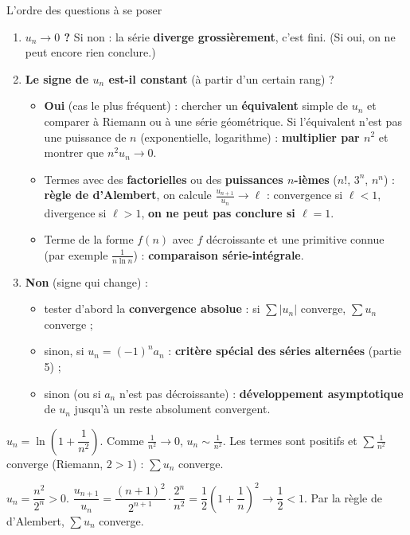 \documentclass[a4paper,10pt]{article}
\begin{document}
\begin{METH}{L'ordre des questions à se poser}
\begin{enumerate}
\item \textbf{$u_n\to0$ ?} Si non : la série \textbf{diverge grossièrement}, c'est fini. (Si oui, on ne peut encore rien conclure.)
\item \textbf{Le signe de $u_n$ est-il constant} (à partir d'un certain rang) ?
\begin{itemize}
\item \textbf{Oui} (cas le plus fréquent) : chercher un \textbf{équivalent} simple de $u_n$ et comparer à Riemann ou à une série géométrique.
Si l'équivalent n'est pas une puissance de $n$ (exponentielle, logarithme) : \textbf{multiplier par $n^2$} et montrer que $n^2u_n\to0$.
\item Termes avec des \textbf{factorielles} ou des \textbf{puissances $n$-ièmes} ($n!$, $3^n$, $n^n$) : \textbf{règle de d'Alembert}, on calcule
$\frac{u_{n+1}}{u_n}\to\ell$ : convergence si $\ell<1$, divergence si $\ell>1$, \textbf{on ne peut pas conclure si $\ell=1$}.
\item Terme de la forme $f(n)$ avec $f$ décroissante et une primitive connue (par exemple $\frac1{n\ln n}$) : \textbf{comparaison série-intégrale}.
\end{itemize}
\item \textbf{Non} (signe qui change) :
\begin{itemize}
\item tester d'abord la \textbf{convergence absolue} : si $\sum|u_n|$ converge, $\sum u_n$ converge ;
\item sinon, si $u_n=(-1)^na_n$ : \textbf{critère spécial des séries alternées} (partie 5) ;
\item sinon (ou si $a_n$ n'est pas décroissante) : \textbf{développement asymptotique} de $u_n$ jusqu'à un reste absolument convergent.
\end{itemize}
\end{enumerate}
\end{METH}

\begin{REDAC}
$u_n=\ln\left(1+\dfrac1{n^2}\right)$. Comme $\frac1{n^2}\to0$, $u_n\sim\frac1{n^2}$. Les termes sont positifs et $\sum\frac1{n^2}$ converge (Riemann,
$2>1$) : $\sum u_n$ converge.
\end{REDAC}

\begin{REDAC}
$u_n=\dfrac{n^2}{2^n}>0$. $\dfrac{u_{n+1}}{u_n}=\dfrac{(n+1)^2}{2^{n+1}}\cdot\dfrac{2^n}{n^2}=\dfrac12\left(1+\dfrac1n\right)^2\to\dfrac12<1$.
Par la règle de d'Alembert, $\sum u_n$ converge.
\end{REDAC}
\end{document}
